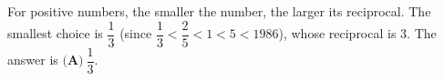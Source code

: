 For positive numbers, the smaller the number, the larger its reciprocal. The smallest choice is $\dfrac13$ (since $\dfrac13<\dfrac25<1<5<1986$), whose reciprocal is $3$. The answer is $\boxed{\textbf{(A)}\ \dfrac13}$.
